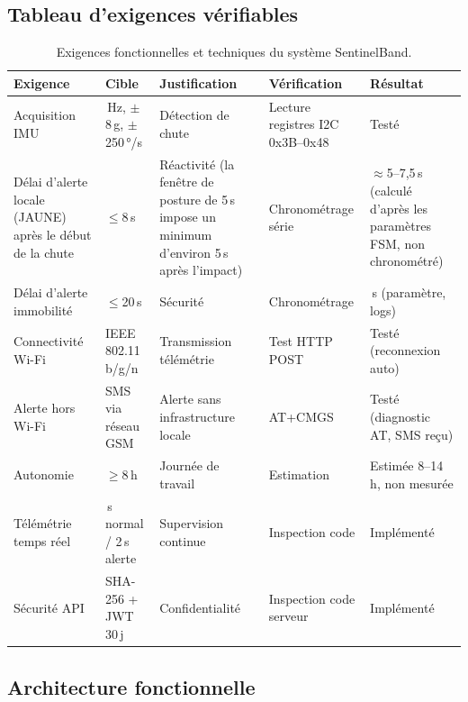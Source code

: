 \documentclass[12pt,a4paper]{article}
\renewcommand{\_}{\textunderscore\allowbreak}
\begin{document}
\subsection{Tableau d'exigences vérifiables}



\begin{table}[H]
\centering
\caption{Exigences fonctionnelles et techniques du système SentinelBand.}
\label{tab:exigences}
\footnotesize
\begin{tabularx}{\textwidth}{>{\raggedright\arraybackslash}X >{\raggedright\arraybackslash}X >{\raggedright\arraybackslash}X >{\raggedright\arraybackslash}X >{\raggedright\arraybackslash}X}
\toprule
\textbf{Exigence} & \textbf{Cible} & \textbf{Justification} & \textbf{Vérification} & \textbf{Résultat} \\
\midrule
Acquisition IMU & 50\,Hz, $\pm$8\,g, $\pm$250\,°/s & Détection de chute & Lecture registres I2C 0x3B--0x48 & Testé \\
\addlinespace
Délai d'alerte locale (JAUNE) après le début de la chute & $\leq$8\,s & Réactivité (la fenêtre de posture de 5\,s impose un minimum d'environ 5\,s après l'impact) & Chronométrage série & $\approx$5--7,5\,s (calculé d'après les paramètres FSM, non chronométré) \\
\addlinespace
Délai d'alerte immobilité & $\leq$20\,s & Sécurité & Chronométrage & 20\,s (paramètre, logs) \\
\addlinespace
Connectivité Wi-Fi & IEEE 802.11 b/g/n & Transmission télémétrie & Test HTTP POST & Testé (reconnexion auto) \\
\addlinespace
Alerte hors Wi-Fi & SMS via réseau GSM & Alerte sans infrastructure locale & AT+CMGS & Testé (diagnostic AT, SMS reçu) \\
\addlinespace
Autonomie & $\geq$8\,h & Journée de travail & Estimation & Estimée 8--14\,h, non mesurée \\
\addlinespace
Télémétrie temps réel & 4\,s normal / 2\,s alerte & Supervision continue & Inspection code & Implémenté \\
\addlinespace
Sécurité API & SHA-256 + JWT 30\,j & Confidentialité & Inspection code serveur & Implémenté \\
\bottomrule
\end{tabularx}
\end{table}

\subsection{Architecture fonctionnelle}
\end{document}
